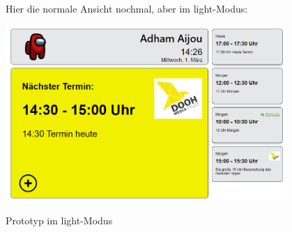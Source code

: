 \newline
\newline
Hier die normale Ansicht nochmal, aber im light-Modus:
\par\vspace{1cm}
    \centering
    \includegraphics[width=0.8\textwidth]{Bilder/Ergebnis_lightMode}
    \caption{Prototyp im light-Modus}
    \label{fig:PrototypLight}
\par\vspace{1cm}
\raggedright
\newline

